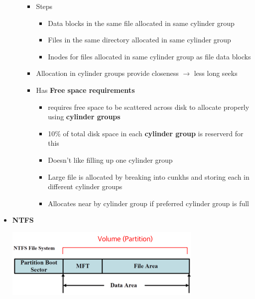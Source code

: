 \documentclass[12pt]{article}
\begin{document}
\begin{itemize}
\begin{itemize}
        \begin{itemize}
            \item Steps
            \begin{itemize}
                \item Data blocks in the same file allocated in same cylinder group
                \item Files in the same directory allocated in same cylinder group
                \item Inodes for files allocated in same cylinder group as file data blocks
            \end{itemize}
            \item Allocation in cylinder groups provide closeness $\to$ less long seeks
            \item Has \textbf{Free space requirements}
            \begin{itemize}
                \item requires free space to be scattered across disk to allocate properly using \textbf{cylinder groups}
                \item 10\% of total disk space in each \textbf{cylinder group} is reserverd for this
                \item Doesn't like filling up one cylinder group
                \item Large file is allocated by breaking into cunkhs and storing each in different cylinder groups
                \item Allocates near by cylinder group if preferred cylinder group is full
            \end{itemize}
        \end{itemize}
    \end{itemize}

    \item \textbf{NTFS}

    \begin{center}
    \includegraphics[width=0.6\linewidth]{images/notes_9.png}
    \end{center}


\end{itemize}
\end{document}
